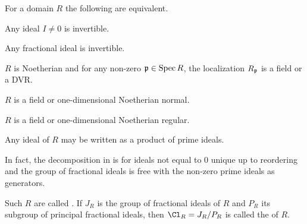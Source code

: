 \documentclass[a4paper,parskip=half,numbers=enddot, DIV=12, headheight=30pt]{scrreprt}
\begin{document}
\begin{thm}
    For a domain $R$ the following are equivalent.
    \begin{alphanumerate}
    \item 
        Any ideal $I\neq 0$ is invertible.
    \item 
        Any fractional ideal is invertible.
    \item 
        $R$ is Noetherian and for any non-zero $\mathfrak{p}\in\operatorname{Spec} R$, the localization $R_{\mathfrak{p}}$ is a field or a DVR.
    \item 
        $R$ is a field or one-dimensional Noetherian normal.
    \item
        $R$ is a field or one-dimensional Noetherian regular.
    \item 
        Any ideal of $R$ may be written as a product of prime ideals.
    \end{alphanumerate}
    In fact, the decomposition in  is for ideals not equal to $0$ unique up to reordering and the group of fractional ideals is free with the non-zero prime ideals as generators.
\end{thm}
\begin{defi}
    Such $R$ are called . If $J_R$ is the group of fractional ideals of $R$ and $P_R$ its subgroup of principal fractional ideals, then  $\Cl_R = J_R/P_R$ is called the  of $R$.
\end{defi}
\end{document}
